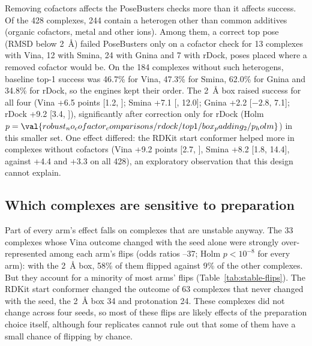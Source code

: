 Removing cofactors affects the PoseBusters checks more than it affects success. Of the 428
complexes, 244 contain a heterogen other than common additives (organic cofactors, metal
and other ions). Among them, a correct top pose (RMSD below \SI{2}{\angstrom}) failed
PoseBusters only on a cofactor check for 13 complexes with Vina, 12 with Smina, 24 with Gnina
and 7 with rDock, poses placed where a removed cofactor would be. On the 184 complexes
without such heterogens, baseline top-1 success was 46.7\% for Vina, 47.3\% for Smina,
62.0\% for Gnina and 34.8\% for rDock, so the engines kept their order. The
\SI{2}{\angstrom} box raised success for all four (Vina +6.5 points [1.2, ]; Smina +7.1
[, 12.0]; Gnina +2.2 [$-2.8$, 7.1]; rDock +9.2 [3.4, ]), significantly after
correction only for rDock (Holm $p = \val{robust_no_cofactor_comparisons/rdock/top1/box_padding_2/p_holm}$) in this smaller set. One effect differed: the
RDKit start conformer helped more in complexes without cofactors (Vina +9.2 points
[2.7, ], Smina +8.2 [1.8, 14.4], against +4.4 and +3.3 on all 428), an exploratory
observation that this design cannot explain.

\subsection{Which complexes are sensitive to preparation}

Part of every arm's effect falls on complexes that are unstable anyway. The 33 complexes
whose Vina outcome changed with the seed alone were strongly over-represented among each
arm's flips (odds ratios --37; Holm $p < 10^{-8}$ for every arm): with the
\SI{2}{\angstrom} box, 58\% of them flipped against 9\% of the other complexes. But they
account for a minority of most arms' flips (Table~\ref{tab:stable-flips}). The RDKit start
conformer changed the outcome of 63 complexes that never changed with the seed, the
\SI{2}{\angstrom} box 34 and protonation 24. These complexes did not change across four
seeds, so most of these flips are likely effects of the preparation choice itself, although
four replicates cannot rule out that some of them have a small chance of flipping by
chance.

